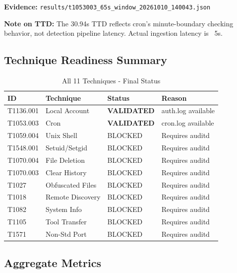 \documentclass[11pt,a4paper]{article}
\begin{document}
\textbf{Evidence:} \texttt{results/t1053003\_65s\_window\_20261010\_140043.json}

\textbf{Note on TTD:} The 30.94s TTD reflects cron's minute-boundary checking behavior, not detection pipeline latency. Actual ingestion latency is ~5s.

\subsection{Technique Readiness Summary}

\begin{table}[H]
    \centering
    \caption{All 11 Techniques - Final Status}
    \begin{tabular}{llll}
        \toprule
        \textbf{ID} & \textbf{Technique} & \textbf{Status} & \textbf{Reason} \\
        \midrule
        T1136.001 & Local Account & \textbf{VALIDATED} & auth.log available \\
        T1053.003 & Cron & \textbf{VALIDATED} & cron.log available \\
        \midrule
        T1059.004 & Unix Shell & BLOCKED & Requires auditd \\
        T1548.001 & Setuid/Setgid & BLOCKED & Requires auditd \\
        T1070.004 & File Deletion & BLOCKED & Requires auditd \\
        T1070.003 & Clear History & BLOCKED & Requires auditd \\
        T1027 & Obfuscated Files & BLOCKED & Requires auditd \\
        T1018 & Remote Discovery & BLOCKED & Requires auditd \\
        T1082 & System Info & BLOCKED & Requires auditd \\
        T1105 & Tool Transfer & BLOCKED & Requires auditd \\
        T1571 & Non-Std Port & BLOCKED & Requires auditd \\
        \bottomrule
    \end{tabular}
\end{table}

\subsection{Aggregate Metrics}
\end{document}
